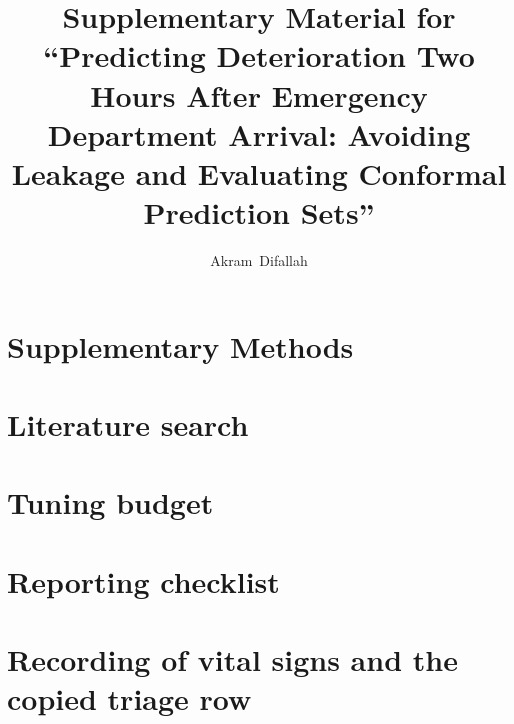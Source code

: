 

\usepackage{longtable}
\usepackage{array}
\usepackage{xr}

\let\origtable\table
\let\endorigtable\endtable
\renewenvironment{table}[1][]{\origtable[H]}{\endorigtable}

\onecolumn
\small
\raggedbottom
\renewcommand{\thetable}{S\arabic{table}}
\renewcommand{\thefigure}{S\arabic{figure}}
\title{Supplementary Material for ``Predicting Deterioration Two Hours After Emergency Department Arrival: Avoiding Leakage and Evaluating Conformal Prediction Sets''}
\author{Akram~Difallah}
\maketitle

\section*{Supplementary Methods}


\section*{Literature search}


\section*{Tuning budget}


\section*{Reporting checklist}
\begingroup\footnotesize\setlength{\tabcolsep}{3pt}\endgroup

\section*{Recording of vital signs and the copied triage row}



